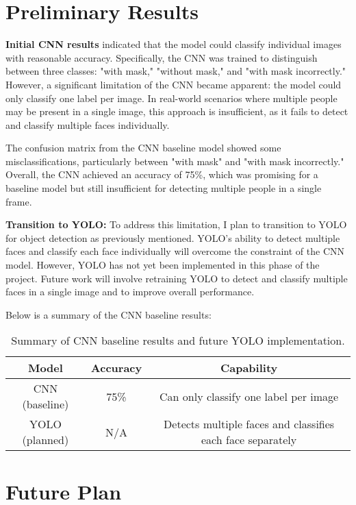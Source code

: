\documentclass[11pt]{article}
\begin{document}
\section{Preliminary Results}

\textbf{Initial CNN results} indicated that the model could classify individual images with reasonable accuracy. Specifically, the CNN was trained to distinguish between three classes: "with mask," "without mask," and "with mask incorrectly." However, a significant limitation of the CNN became apparent: the model could only classify one label per image. In real-world scenarios where multiple people may be present in a single image, this approach is insufficient, as it fails to detect and classify multiple faces individually.

The confusion matrix from the CNN baseline model showed some misclassifications, particularly between "with mask" and "with mask incorrectly." Overall, the CNN achieved an accuracy of 75\%, which was promising for a baseline model but still insufficient for detecting multiple people in a single frame.

\textbf{Transition to YOLO:} To address this limitation, I plan to transition to YOLO for object detection as previously mentioned. YOLO's ability to detect multiple faces and classify each face individually will overcome the constraint of the CNN model. However, YOLO has not yet been implemented in this phase of the project. Future work will involve retraining YOLO to detect and classify multiple faces in a single image and to improve overall performance.

Below is a summary of the CNN baseline results:

\begin{table}[h!]
  \centering
  \begin{tabular}{|c|c|c|}
    \hline
    Model & Accuracy & Capability \\
    \hline
    CNN (baseline) & 75\% & Can only classify one label per image \\
    YOLO (planned) & N/A & Detects multiple faces and classifies each face separately \\
    \hline
  \end{tabular}
  \caption{Summary of CNN baseline results and future YOLO implementation.}
\end{table}



\section{Future Plan}
\end{document}
